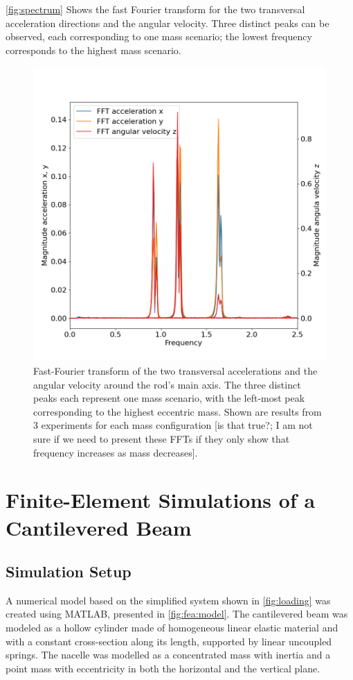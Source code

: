 \documentclass{article}
\begin{document}
\autoref{fig:spectrum} Shows the fast Fourier transform for the two transversal acceleration directions and the angular velocity. Three distinct peaks can be observed, each corresponding to one mass scenario; the lowest frequency corresponds to the highest mass scenario. 

\begin{figure}[ht]
    \centering
    \includegraphics[width=0.5\linewidth]{../results/experiment/spectrum.png}
    \caption{Fast-Fourier transform of the two transversal accelerations and the angular velocity around the rod's main axis. The three distinct peaks each represent one mass scenario, with the left-most peak corresponding to the highest eccentric mass. Shown are results from 3 experiments for each mass configuration [is that true?; I am not sure if we need to present these FFTs if they only show that frequency increases as mass decreases].}
    \label{fig:spectrum}
\end{figure}

\clearpage

\section{Finite-Element Simulations of a Cantilevered Beam}
\label{sec:simulations}

\subsection{Simulation Setup}

A numerical model based on the simplified system shown in \autoref{fig:loading} was created using MATLAB, presented in \autoref{fig:fea:model}. The cantilevered beam was modeled as a hollow cylinder made of  homogeneous linear elastic material and with a constant cross-section along its length, supported by linear uncoupled springs. The nacelle was modelled as a concentrated mass with inertia and a point mass with eccentricity in both the horizontal and the vertical plane.
\end{document}
